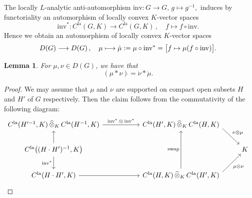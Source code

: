 \documentclass[a4paper, reqno, 10pt]{amsart}
\newtheorem{lemma}[theorem]{Lemma}
\theoremstyle{definition}
\numberwithin{equation}{section}
\newcommand{\botimes}[1]{{\,\otimes_{#1}\,}}
\newcommand{\cotimes}[1]{{\,\widehat{\otimes}_{#1}\,}}
\newcommand{\defeq}{\vcentcolon=}
\newcommand{\inv}{{\mathrm{inv}}}
\newcommand{\la}{{\mathrm{la}}}
\newcommand{\lra}{\longrightarrow}
\newcommand{\lto}{\longmapsto}
\newcommand{\mto}{\mapsto}
\newcommand{\ra}{\rightarrow}
\begin{document}
The locally $L$-analytic anti-automorphism $\inv \colon G \ra G, \, g \mto g^{-1},$ induces by functoriality an automorphism of locally convex $K$-vector spaces
\begin{equation*}
	\inv^\ast \colon C^\la (G,K) \lra C^\la (G,K) \,,\quad f \lto f\circ \inv.
\end{equation*}
Hence we obtain an automorphism of locally convex $K$-vector spaces
\begin{equation}\label{Eq 1 - Definition of involution of distribution algebra}
	D(G) \lra D(G) \,,\quad \mu \lto \dot{\mu} \defeq \mu \circ \inv^\ast = \big[f \mto \mu(f \circ \inv)\big] .
\end{equation}


\begin{lemma}\label{Prop 1 - Involution of distribution algebra and convolution}
	For $\mu, \nu \in D(G)$, we have that
	\begin{equation}
		\left( \mu \ast \nu \right)\dot{} = \dot{\nu} \ast \dot{\mu} .
	\end{equation}
\end{lemma}
\begin{proof}
	We may assume that $\mu$ and $\nu$ are supported on compact open subsets $H$ and $H'$ of $G$ respectively.
	Then the claim follows from the commutativity of the following diagram:
	\begin{equation*}
		\begin{tikzcd}
			C^\la(H'^{-1},K) \cotimes{K} C^\la(H^{-1},K) \ar[r, "\inv^\ast \botimes{} \inv^\ast"] &[+30pt] C^\la(H',K) \cotimes{K} C^\la(H,K) \ar[rd, start anchor=355, "\nu \otimes \mu"]& \\
			C^\la\big((H\cdot H')^{-1},K \big) \ar[u] \ar[d, "\inv^\ast"'] && K \\
			C^\la(H\cdot H',K) \ar[r] &C^\la(H,K) \cotimes{K} C^\la(H',K) \ar[uu, "\mathrm{swap}"] \ar[ru, start anchor= 5, "\mu \otimes \nu"'] & 
		\end{tikzcd}
	\end{equation*}
\end{proof}
\end{document}
